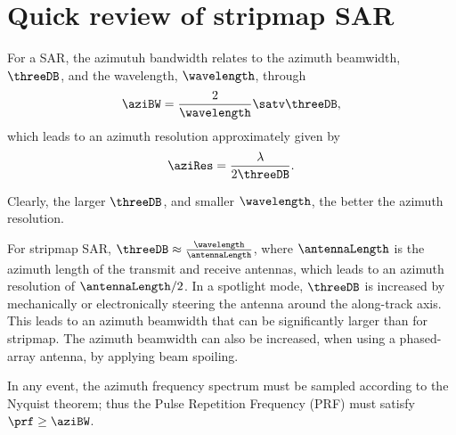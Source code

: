 \section{Quick review of stripmap SAR}
For a SAR, the azimutuh bandwidth relates to the azimuth beamwidth, $\threeDB$, and the wavelength, $\wavelength$, through
\begin{equation}
 \aziBW = \frac{2}{\wavelength}\satv\threeDB,
\end{equation}
which leads to an azimuth resolution approximately given by
\begin{equation}
 \aziRes = \frac{\lambda}{2\threeDB}.
\end{equation}
\par
Clearly, the larger $\threeDB$, and smaller $\wavelength$, the better the azimuth resolution.
\par
For stripmap SAR, $\threeDB \approx \frac{\wavelength}{\antennaLength}$, where $\antennaLength$ is the azimuth length of the transmit and receive antennas, which leads to an azimuth resolution of $\antennaLength/2$. In a spotlight mode, $\threeDB$ is increased by mechanically or electronically steering the antenna around the along-track axis. This leads to an azimuth beamwidth that can be significantly larger than for stripmap. The azimuth beamwidth can also be increased, when using a phased-array antenna, by applying beam spoiling.
\par
In any event, the azimuth frequency spectrum must be sampled according to the Nyquist theorem; thus the Pulse Repetition Frequency (PRF) must satisfy $\prf \geq \aziBW$.